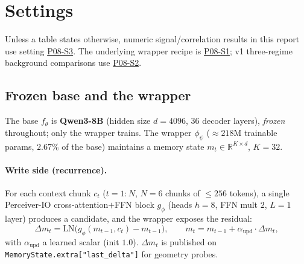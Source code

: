 \documentclass[11pt]{article}
\newcommand{\code}[1]{\texttt{#1}}
\begin{document}
\section{Settings}
\label{sec:settings}

Unless a table states otherwise, numeric signal/correlation results in
this report use setting
\href{https://github.com/BDeMo/research-notes/blob/main/notes/plans/08-model-outputs-delta-w/settings/settings.md#p08-s3--v15-intrinsic-signal-probe}{P08-S3}.
The underlying wrapper recipe is
\href{https://github.com/BDeMo/research-notes/blob/main/notes/plans/08-model-outputs-delta-w/settings/settings.md#p08-s1--v1-canonical-wrapper-recipe}{P08-S1};
v1 three-regime background comparisons use
\href{https://github.com/BDeMo/research-notes/blob/main/notes/plans/08-model-outputs-delta-w/settings/settings.md#p08-s2--v1-phase-y-three-regime-benchmark-cells}{P08-S2}.

\subsection{Frozen base and the wrapper}
The base $f_\theta$ is \textbf{Qwen3-8B} (hidden size $d=4096$, $36$
decoder layers), \emph{frozen} throughout; only the wrapper trains. The
wrapper $\phi_\psi$ ($\approx 218$M trainable params, $2.67\%$ of the
base) maintains a memory state $m_t\in\mathbb{R}^{K\times d}$, $K=32$.

\paragraph{Write side (recurrence).} For each context chunk $c_t$
($t=1{:}N$, $N=6$ chunks of $\le 256$ tokens), a single Perceiver-IO
cross-attention$+$FFN block $g_\phi$ (heads $h=8$, FFN mult $2$,
$L=1$ layer) produces a candidate, and the wrapper exposes the residual:
\begin{equation}
\Delta m_t = \mathrm{LN}\!\big(g_\phi(m_{t-1},c_t)-m_{t-1}\big),
\qquad
m_t = m_{t-1} + \alpha_{\mathrm{upd}}\cdot \Delta m_t,
\end{equation}
with $\alpha_{\mathrm{upd}}$ a learned scalar (init $1.0$). $\Delta m_t$
is published on \code{MemoryState.extra["last\_delta"]} for geometry
probes.
\end{document}
